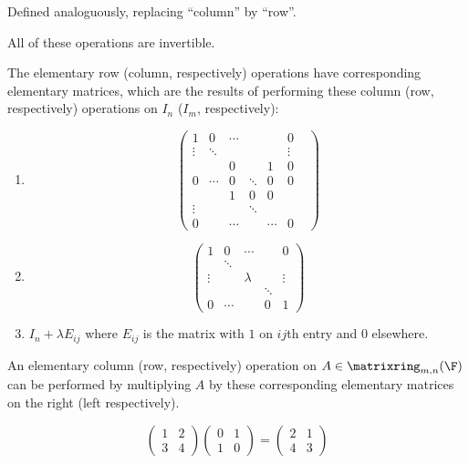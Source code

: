 \documentclass[a4paper]{article}
\newcommand*{\M}{\matrixring}
\theoremstyle{definition}
\begin{document}
\begin{definition}
  Defined analoguously, replacing ``column'' by ``row''.
\end{definition}

\begin{note}
  All of these operations are invertible.
\end{note}

\begin{definition}
The elementary row (column, respectively) operations have corresponding elementary matrices, which are the results of performing these column (row, respectively) operations on \(I_n\) (\(I_m\), respectively):
\begin{enumerate}
\item
  \[
    \begin{pmatrix}
      1 & 0 & \cdots & & & 0 \\
      \vdots & \ddots & & & & \vdots \\
      & & 0 & & 1 & 0 \\
      0 & \cdots & 0 & \ddots & 0 & 0 \\
      & & 1 & 0 & 0 & & \\
      \vdots & &&  \ddots & \\
      0 & & \cdots & & \cdots & 0
    \end{pmatrix}
  \]
\item
  \[
    \begin{pmatrix}
      1 & 0 & \cdots & & 0 \\
       & \ddots & & & \\
      \vdots & & \lambda & & \vdots \\
       & & & \ddots & \\
      0 & \cdots & & 0 & 1
    \end{pmatrix}
  \]
\item \(I_n+\lambda E_{ij}\) where \(E_{ij}\) is the matrix with \(1\) on \(ij\)th entry and \(0\) elsewhere.
\end{enumerate}
\end{definition}

An elementary column (row, respectively) operation on \(A\in \M_{m,n}(\F)\) can be performed by multiplying \(A\) by these corresponding elementary matrices on the right (left respectively).

\begin{eg}
  \[
    \begin{pmatrix}
      1 & 2 \\ 3 & 4
    \end{pmatrix}
    \begin{pmatrix} 0 & 1 \\ 1 & 0 \end{pmatrix} = \begin{pmatrix} 2 & 1 \\ 4 & 3 \end{pmatrix}
  \]
\end{eg}
\end{document}
